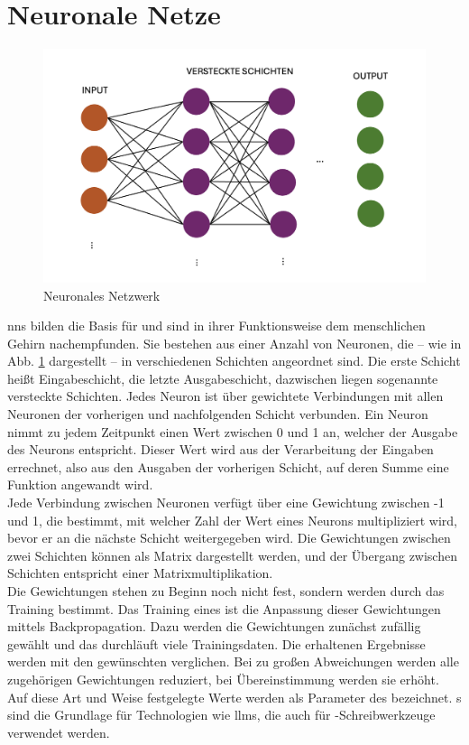 \documentclass[../main.tex]{subfiles}
\begin{document}
\section{Neuronale Netze}

\begin{figure}[h!]
  \includegraphics[scale=0.6]{bilder/NeuralNetwork.png}
  \caption{Neuronales Netzwerk}
  \label{fig:NN}
\end{figure}

\glspl{nn} bilden die Basis für  und sind in ihrer Funktionsweise dem menschlichen Gehirn nachempfunden. Sie bestehen aus einer Anzahl von Neuronen, die – wie in Abb. \ref{fig:NN} dargestellt – in verschiedenen Schichten angeordnet sind. Die erste Schicht heißt Eingabeschicht, die letzte Ausgabeschicht, dazwischen liegen sogenannte versteckte Schichten. Jedes Neuron ist über gewichtete Verbindungen mit allen Neuronen der vorherigen und nachfolgenden Schicht verbunden. Ein Neuron nimmt zu jedem Zeitpunkt einen Wert zwischen 0 und 1 an, welcher der Ausgabe des Neurons entspricht. Dieser Wert wird aus der Verarbeitung der Eingaben errechnet, also aus den Ausgaben der vorherigen Schicht, auf deren Summe eine Funktion angewandt wird. \\
Jede Verbindung zwischen Neuronen verfügt über eine Gewichtung zwischen -1 und 1, die bestimmt, mit welcher Zahl der Wert eines Neurons multipliziert wird, bevor er an die nächste Schicht weitergegeben wird. Die Gewichtungen zwischen zwei Schichten können als Matrix dargestellt werden, und der Übergang zwischen Schichten entspricht einer Matrixmultiplikation. \\
Die Gewichtungen stehen zu Beginn noch nicht fest, sondern werden durch das Training bestimmt. Das Training eines  ist die Anpassung dieser Gewichtungen mittels Backpropagation. Dazu werden die Gewichtungen zunächst zufällig gewählt und das  durchläuft viele Trainingsdaten. Die erhaltenen Ergebnisse werden mit den gewünschten verglichen. Bei zu großen Abweichungen werden alle zugehörigen Gewichtungen reduziert, bei Übereinstimmung werden sie erhöht. Auf diese Art und Weise festgelegte Werte werden als Parameter des  bezeichnet. s sind die Grundlage für Technologien wie \glspl{llm}, die auch für -Schreibwerkzeuge verwendet werden. 
\end{document}
